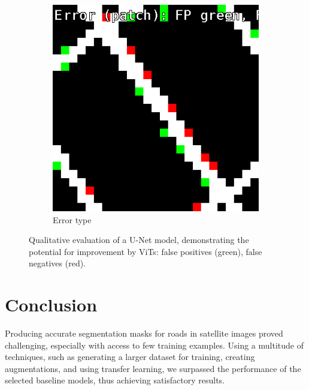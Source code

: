 \documentclass[10pt,conference,compsocconf]{IEEEtran}
\begin{document}
\begin{figure}[h]
\begin{subfigure}[t]{.25\linewidth}
\end{subfigure}%
\begin{subfigure}[t]{.25\linewidth}
  \centering
  \includegraphics[width=.9\linewidth]{pictures/eval_patch_diff.png}
  \caption{\footnotesize Error type}
  \label{fig:patch_diff_patches}
\end{subfigure}
\caption{Qualitative evaluation of a U-Net model, demonstrating the potential for improvement by ViTs: false positives (green), false negatives (red).}
\label{fig:patch_diff}
\vspace{-0.1cm}
\end{figure}

\section{Conclusion}
Producing accurate segmentation masks for roads in satellite images proved challenging, especially with access to few training examples. Using a multitude of techniques, such as generating a larger dataset for training, creating augmentations, and using transfer learning, we surpassed the performance of the selected baseline models, thus achieving satisfactory results.


\newpage



\newpage
\end{document}
